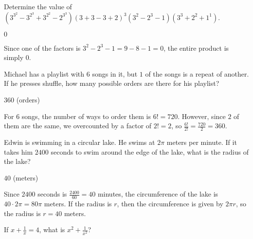 \documentclass[11pt]{article}
\begin{document}
\begin{problem}%
Determine the value of $(3^{3^2} - 3^{2^3} + 3^{2^2} - 2^{3^3})(3 + 3 - 3 + 2)^3(3^2 - 2^3 - 1)(3^3 + 2^2 + 1^1)$.
\end{problem}

\begin{answer}
$\boxed{0}$
\end{answer}

\begin{solution}
Since one of the factors is $3^2 - 2^3 - 1 = 9 - 8 - 1 = 0$, the entire product is simply $\boxed{0}$.
\end{solution}


\begin{problem}%
Michael has a playlist with $6$ songs in it, but $1$ of the songs is a repeat of another. If he presses shuffle, how many possible orders are there for his playlist?
\end{problem}

\begin{answer}
$\boxed{360}$ (orders)
\end{answer}

\begin{solution}
For $6$ songs, the number of ways to order them is $6! = 720$. However, since $2$ of them are the same, we overcounted by a factor of $2! = 2$, so $\frac{6!}{2!} = \frac{720}{2} = \boxed{360}$.
\end{solution}


\begin{problem}%
Edwin is swimming in a circular lake. He swims at $2\pi$ meters per minute. If it takes him $2400$ seconds to swim around the edge of the lake, what is the radius of the lake?
\end{problem}

\begin{answer}
$\boxed{40}$ (meters)
\end{answer}

\begin{solution}
Since $2400$ seconds is $\frac{2400}{60} = 40$ minutes, the circumference of the lake is $40 \cdot 2\pi = 80\pi$ meters. If the radius is $r$, then the circumference is given by $2\pi r$, so the radius is $r = \boxed{40}$ meters.
\end{solution}


\begin{problem}%
If $x + \frac{1}{x} = 4$, what is $x^2 + \frac{1}{x^2}$?
\end{problem}
\end{document}
